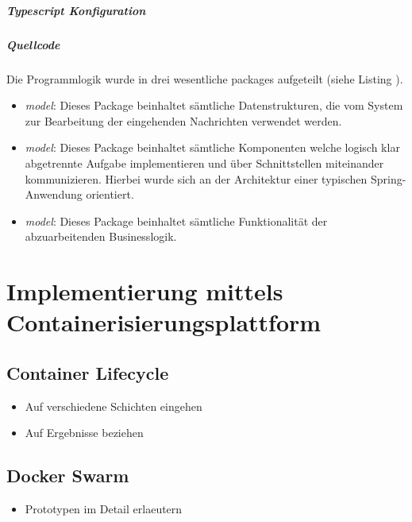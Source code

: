 \subparagraph{Typescript Konfiguration}

\subparagraph{Quellcode}


Die Programmlogik wurde in drei wesentliche packages aufgeteilt (siehe Listing ). 

\begin{itemize}
  \item \emph{model}: Dieses Package beinhaltet sämtliche Datenstrukturen, die vom System zur Bearbeitung der eingehenden Nachrichten verwendet werden.
  \item \emph{model}: Dieses Package beinhaltet sämtliche Komponenten welche logisch klar abgetrennte Aufgabe implementieren und über Schnittstellen miteinander kommunizieren. Hierbei wurde sich an der Architektur einer typischen Spring-Anwendung orientiert.
  \item \emph{model}: Dieses Package beinhaltet sämtliche Funktionalität der abzuarbeitenden Businesslogik.
\end{itemize}





\section{Implementierung mittels Containerisierungsplattform}
\subsection{Container Lifecycle}
\begin{itemize}
  \item Auf verschiedene Schichten eingehen
  \item Auf Ergebnisse beziehen
\end{itemize}
\subsection{Docker Swarm}

\begin{itemize}
  \item Prototypen im Detail erlaeutern
\end{itemize}


